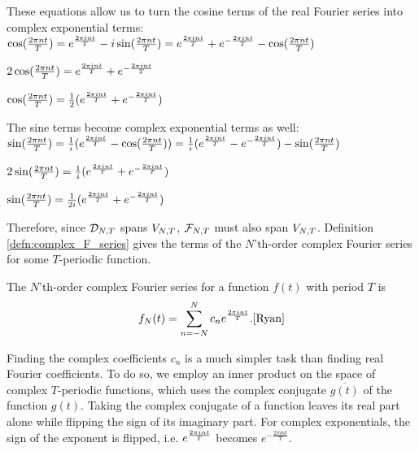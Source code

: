 \newpage 

\par These equations allow us to turn the cosine terms of the real Fourier series into complex exponential terms:\\

\indentt $\cos(\frac{2\pi nt}{T}) = e^{\frac{2 \pi i nt}{T}} - i\sin(\frac{2\pi nt}{T}) = e^{\frac{2 \pi i nt}{T}} + e^{-\frac{2\pi int}{T}} - \cos(\frac{2\pi nt}{T})$

\indentt $2\cos(\frac{2\pi nt}{T}) = e^{\frac{2 \pi i nt}{T}} + e^{-\frac{2\pi int}{T}}$

\indentt $\cos(\frac{2\pi nt}{T}) = \frac{1}{2} (e^{\frac{2 \pi i nt}{T}} + e^{-\frac{2\pi int}{T}})$\\

\par The sine terms become complex exponential terms as well:\\

\indentt $\sin(\frac{2\pi nt}{T}) = \frac{1}{i} (e^{\frac{2 \pi i nt}{T}} - \cos(\frac{2\pi nt}{T})) = \frac{1}{i} (e^{\frac{2 \pi i nt}{T}} - e^{-\frac{2\pi int}{T}}) - \sin(\frac{2\pi nt}{T})$

\indentt $2\sin(\frac{2\pi nt}{T}) = \frac{1}{i} (e^{\frac{2 \pi i nt}{T}} + e^{-\frac{2\pi int}{T}})$

\indentt $\sin(\frac{2\pi nt}{T}) = \frac{1}{2i} (e^{\frac{2 \pi i nt}{T}} + e^{-\frac{2\pi int}{T}})$\\

\par Therefore, since $\mathcal{D}_{N,T}$ spans $V_{N,T}$, $\mathcal{F}_{N,T}$ must also span $V_{N,T}$. Definition \ref{defn:complex_F_series} gives the terms of the $N$'th-order complex Fourier series for some $T$-periodic function.

\begin{definition}{The $N$'th-order complex Fourier series for a function $f(t)$ with period $T$ is}
    $$f_N(t)=\sum_{n=-N}^{N}{c_n e^{\frac{2 \pi i nt}{T}}}.\cite{Ryan}$$
    \label{defn:complex_F_series}
\end{definition}

Finding the complex coefficients $c_n$ is a much simpler task than finding real Fourier coefficients. To do so, we employ an inner product on the space of complex $T$-periodic functions, which uses the complex conjugate $\overline{g(t)}$ of the function $g(t)$. Taking the complex conjugate of a function leaves its real part alone while flipping the sign of its imaginary part. For complex exponentials, the sign of the exponent is flipped, i.e. $e^{\frac{2 \pi i nt}{T}}$ becomes $e^{-\frac{2\pi int}{T}}$.

